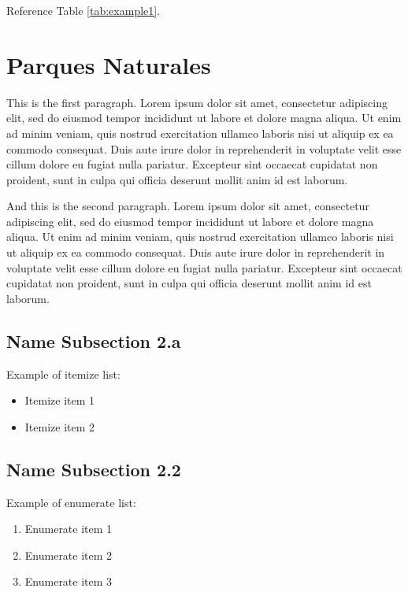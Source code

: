 \documentclass{article}
\begin{document}
Reference Table \ref{tab:example1}.



\section{Parques Naturales}

This is the first paragraph. Lorem ipsum dolor sit amet, consectetur adipiscing elit, sed do eiusmod tempor incididunt ut labore et dolore magna aliqua. Ut enim ad minim veniam, quis nostrud exercitation ullamco laboris nisi ut aliquip ex ea commodo consequat. Duis aute irure dolor in reprehenderit in voluptate velit esse cillum dolore eu fugiat nulla pariatur. Excepteur sint occaecat cupidatat non proident, sunt in culpa qui officia deserunt mollit anim id est laborum.

And this is the second paragraph. Lorem ipsum dolor sit amet, consectetur adipiscing elit, sed do eiusmod tempor incididunt ut labore et dolore magna aliqua. Ut enim ad minim veniam, quis nostrud exercitation ullamco laboris nisi ut aliquip ex ea commodo consequat. Duis aute irure dolor in reprehenderit in voluptate velit esse cillum dolore eu fugiat nulla pariatur. Excepteur sint occaecat cupidatat non proident, sunt in culpa qui officia deserunt mollit anim id est laborum.



\subsection{Name Subsection 2.a}

Example of itemize list:


\begin{itemize}
  \item Itemize item 1
  \item Itemize item 2
\end{itemize}



\subsection{Name Subsection 2.2}

Example of enumerate list:

\begin{enumerate}
  \item Enumerate item 1
  \item Enumerate item 2
  \item Enumerate item 3
\end{enumerate}
\end{document}
